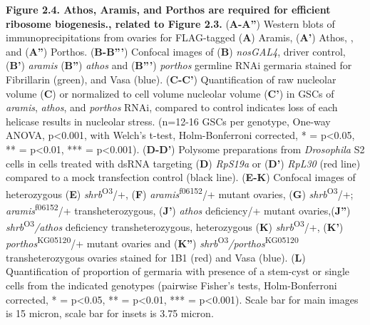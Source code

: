 \documentclass[12pt,oneside]{reedthesis}
\begin{document}
\textbf{\hfill\break
}

\textbf{Figure 2.4. Athos, Aramis, and Porthos are required for
efficient ribosome biogenesis., related to Figure 2.3.} (\textbf{A-A''})
Western blots of immunoprecipitations from ovaries for FLAG-tagged
(\textbf{A}) Aramis, (\textbf{A'}) Athos, , and (\textbf{A''}) Porthos. (\textbf{B-B'''})
Confocal images of (\textbf{B}) \emph{nosGAL4}, driver control, (\textbf{B'}) \emph{aramis}
(\textbf{B''}) \emph{athos} and (\textbf{B'''}) \emph{porthos} germline RNAi germaria
stained for Fibrillarin (green), and Vasa (blue). (\textbf{C-C'})
Quantification of raw nucleolar volume (\textbf{C}) or normalized to cell
volume nucleolar volume (\textbf{C'}) in GSCs of \emph{aramis}, \emph{athos}, and
\emph{porthos} RNAi, compared to control indicates loss of each helicase
results in nucleolar stress. (n=12-16 GSCs per genotype, One-way ANOVA,
p\textless0.001, with Welch's t-test, Holm-Bonferroni corrected, * = p\textless0.05,
** = p\textless0.01, *** = p\textless0.001). (\textbf{D-D'}) Polysome preparations
from \emph{Drosophila} S2 cells in cells treated with dsRNA targeting (\textbf{D})
\emph{RpS19a} or (\textbf{D'}) \emph{RpL30} (red line) compared to a mock transfection
control (black line). (\textbf{E-K}) Confocal images of heterozygous (\textbf{E})
\emph{shrb}\textsuperscript{O3}/+, (\textbf{F}) \emph{aramis}\textsuperscript{f06152}/+ mutant ovaries, (\textbf{G})
\emph{shrb}\textsuperscript{O3}/+; \emph{aramis}\textsuperscript{f06152}/+ transheterozygous, (\textbf{J'}) \emph{athos}
deficiency/+ mutant ovaries,(\textbf{J''}) \emph{shrb}\textsuperscript{O3}\emph{/athos} deficiency
transheterozygous, heterozygous (\textbf{K}) \emph{shrb}\textsuperscript{O3}/+, (\textbf{K'})
\emph{porthos}\textsuperscript{KG05120}/+ mutant ovaries and (\textbf{K''})
\emph{shrb}\textsuperscript{O3}\emph{/porthos}\textsuperscript{KG05120} transheterozygous ovaries stained for 1B1
(red) and Vasa (blue). (\textbf{L}) Quantification of proportion of germaria
with presence of a stem-cyst or single cells from the indicated
genotypes (pairwise Fisher's tests, Holm-Bonferroni corrected, * =
p\textless0.05, ** = p\textless0.01, *** = p\textless0.001). Scale bar for main images
is 15 micron, scale bar for insets is 3.75 micron.

\textbf{\hfill\break
}
\end{document}
